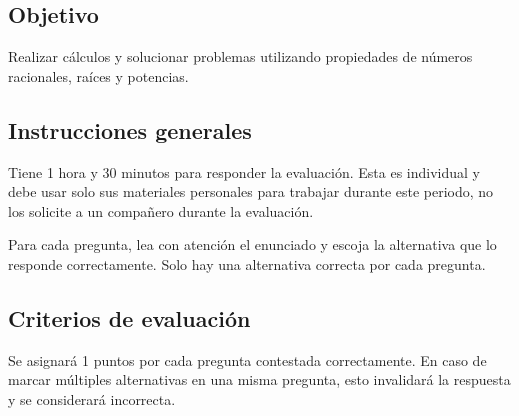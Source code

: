 \documentclass[revolver]{srs}
\begin{document}
\subsection*{Objetivo}
Realizar cálculos y solucionar problemas utilizando propiedades de números racionales,
raíces y potencias.

\subsection*{Instrucciones generales}
Tiene 1 hora y 30 minutos para responder la evaluación. Esta es individual y debe
usar solo sus materiales personales para trabajar durante este periodo, no los solicite
a un compañero durante la evaluación.

Para cada pregunta, lea con atención el enunciado y escoja la alternativa que lo
responde correctamente. Solo hay una alternativa correcta por cada pregunta.

\subsection*{Criterios de evaluación}
Se asignará 1 puntos por cada pregunta contestada correctamente. En caso de marcar múltiples
alternativas en una misma pregunta, esto invalidará la respuesta y se considerará incorrecta.

\separador[2mm]
\end{document}
